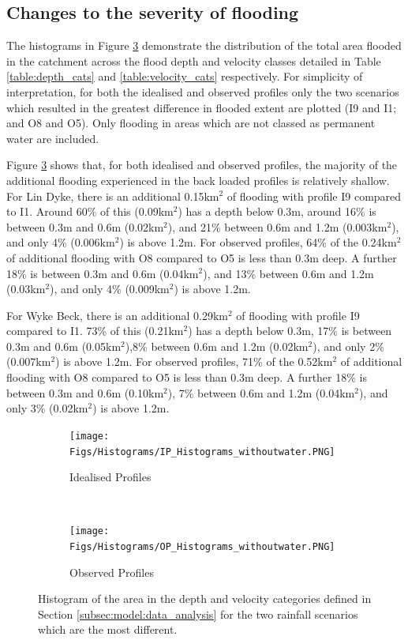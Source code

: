 \documentclass[APA,Times2COL]{WileyNJDv5}
\begin{document}
\subsection{Changes to the severity of flooding}\label{subsec:model}
The histograms in Figure \ref{fig:histograms} demonstrate the distribution of the total area flooded in the catchment across the flood depth and velocity classes detailed in Table \ref{table:depth_cats} and \ref{table:velocity_cats} respectively. For simplicity of interpretation, for both the idealised and observed profiles only the two scenarios which resulted in the greatest difference in flooded extent are plotted (I9 and I1; and O8 and O5). Only flooding in areas which are not classed as permanent water are included. 

Figure \ref{fig:histograms} shows that, for both idealised and observed profiles, the majority of the additional flooding experienced in the back loaded profiles is relatively shallow. For Lin Dyke, there is an additional 0.15km$^2$ of flooding with profile I9 compared to I1. Around 60\% of this (0.09km$^2$) has a depth below 0.3m, around 16\% is between 0.3m and 0.6m (0.02km$^2$), and 21\% between 0.6m and 1.2m (0.003km$^2$), and only 4\% (0.006km$^2$) is above 1.2m. For observed profiles, 64\% of the 0.24km$^2$ of additional flooding with O8 compared to O5 is less than 0.3m deep.  A further 18\% is between 0.3m and 0.6m (0.04km$^2$), and 13\% between 0.6m and 1.2m (0.03km$^2$), and only 4\% (0.009km$^2$) is above 1.2m.

For Wyke Beck, there is an additional 0.29km$^2$ of flooding with profile I9 compared to I1. 73\% of this (0.21km$^2$) has a depth below 0.3m, 17\% is between 0.3m and 0.6m (0.05km$^2$),8\% between 0.6m and 1.2m (0.02km$^2$), and only 2\% (0.007km$^2$) is above 1.2m. For observed profiles, 71\% of the 0.52km$^2$ of additional flooding with O8 compared to O5 is less than 0.3m deep.  A further 18\% is between 0.3m and 0.6m (0.10km$^2$), 7\% between 0.6m and 1.2m (0.04km$^2$), and only 3\% (0.02km$^2$) is above 1.2m. 

\begin{figure}[!t]
\centering
\begin{subfigure}[H]{\linewidth}
   \centering
   \texttt{[image: Figs/Histograms/IP\_Histograms\_withoutwater.PNG]}
   \caption{Idealised Profiles}
   \label{fig:IP_histogram_withoutwater}
\end{subfigure}
\\[\baselineskip]
\begin{subfigure}{\linewidth}
   \centering
   \texttt{[image: Figs/Histograms/OP\_Histograms\_withoutwater.PNG]}
   \caption{Observed Profiles}
   \label{fig:OP_histogram_withoutwater}
\end{subfigure}
\centering
\caption{Histogram of the area in the depth and velocity categories defined in Section \ref{subsec:model:data_analysis} for the two rainfall scenarios which are the most different.} \label{fig:histograms} 
\end{figure}
\afterpage{\clearpage}
\end{document}
